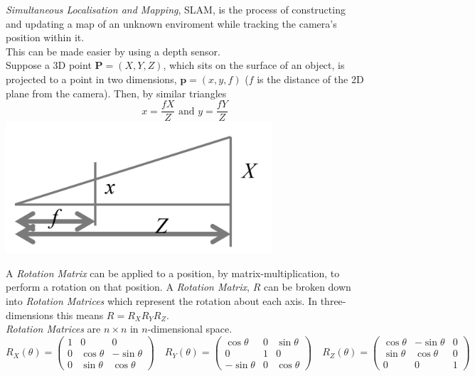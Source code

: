 \documentclass[11pt,a4paper]{article}
\begin{document}
\textit{Simultaneous Localisation and Mapping}, SLAM, is the process of constructing and updating a map of an unknown enviroment while tracking the camera's position within it.\\
\nb This can be made easier by using a depth sensor.\\

Suppose a 3D point $\textbf{P}=(X,Y,Z)$, which sits on the surface of an object, is projected to a point in two dimensions, $\textbf{p}=(x,y,f)$ ($f$ is the distance of the 2D plane from the camera). Then, by similar triangles
$$x=\frac{fX}{Z}\text{ and }y=\frac{fY}{Z}$$
\includegraphics[scale=.5]{img/perspectiveprojectionequations.png}

A \textit{Rotation Matrix} can be applied to a position, by matrix-multiplication, to perform a rotation on that position. A \textit{Rotation Matrix}, $R$ can be broken down into \textit{Rotation Matrices} which represent the rotation about each axis. In three-dimensions this means $R=R_XR_YR_Z$.\\
\nb \textit{Rotation Matrices} are $n\times n$ in $n$-dimensional space.\\

$$R_X(\theta)=\begin{pmatrix}1&0&0\\0&\cos\theta&-\sin\theta\\0&\sin\theta&\cos\theta\end{pmatrix}\quad R_Y(\theta)=\begin{pmatrix}\cos\theta&0&\sin\theta\\0&1&0\\-\sin\theta&0&\cos\theta\end{pmatrix}\quad R_Z(\theta)=\begin{pmatrix}\cos\theta&-\sin\theta&0\\\sin\theta&\cos\theta&0\\0&0&1\end{pmatrix}$$
\end{document}
